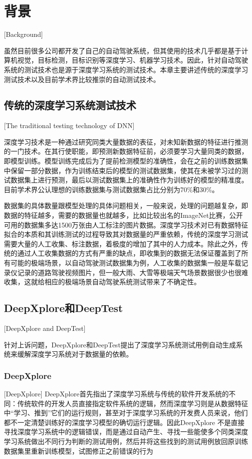 
\chapter{背景}[Background]

虽然目前很多公司都开发了自己的自动驾驶系统，但其使用的技术几乎都是基于计算机视觉，目标检测，目标识别等深度学习、机器学习技术。因此，针对自动驾驶系统的测试技术也是源于深度学习系统的测试技术。本章主要讲述传统的深度学习测试技术以及目前学术界比较推崇的自动测试技术。

\section{传统的深度学习系统测试技术}[The traditional testing technology of DNN]

深度学习技术是一种通过研究同类大量数据的表征，对未知新数据的特征进行推测的一门技术。在其行使职能，即预测新数据特征前，必须要学习大量同类的数据，即模型训练。模型训练完成后为了提前检测模型的准确性，会在之前的训练数据集中保留一部分数据，作为训练结束后的模型的测试数据集，使其在未被学习过的测试数据集上进行预测，最后以测试数据集上的准确性作为训练好的模型的精准度。目前学术界公认理想的训练数据集与测试数据集占比分别为70\%和30\%。


数据集的具体数量跟模型处理的具体问题相关，一般来说，处理的问题越复杂，即数据的特征越多，需要的数据量也就越多，比如比较出名的ImageNet\cite{ImageNet}比赛，公开可用的数据集多达1500万张由人工标注的图片数据。深度学习技术对已有数据特征拟合的本质和其训练测试的过程导致其对数据量的严重依赖，传统的深度学习测试需要大量的人工收集、标注数据，着极度的增加了其中的人力成本。除此之外，传统的通过人工收集数据的方式有严重的缺点，即收集到的数据无法保证覆盖到了所有可能的极端场景，以自动驾驶测试数据集为例，人工收集的数据集一般是车载记录仪记录的道路驾驶视频图片，但一般大雨、大雪等极端天气场景数据很少也很难收集，这就给相应的极端场景自动驾驶系统测试带来了不确定性。

\section{DeepXplore和DeepTest}[DeepXplore and DeepTest]

针对上诉问题，DeepXplore和DeepTest提出了深度学习系统测试用例自动生成系统来缓解深度学习系统对于数据量的依赖。

\subsection{DeepXplore}[DeepXplore]
DeepXplore首先指出了深度学习系统与传统的软件开发系统的不同：传统软件的开发人员直接指定软件系统的逻辑，然而深度学习则是从数据特征中“学习、推到”它们的运行规则，甚至对于深度学习系统的开发费人员来说，他们都不一定清楚训练好的深度学习模型的确切运行逻辑。因此DeepXplore
不是直接寻找深度学习系统中的逻辑错误，而是通过自动产生、寻找一些能使多个同类深度学习系统做出不同行为判断的测试用例，然后并将这些找到的测试用例放回原训练数据集里重新训练模型，试图修正之前错误的行为

